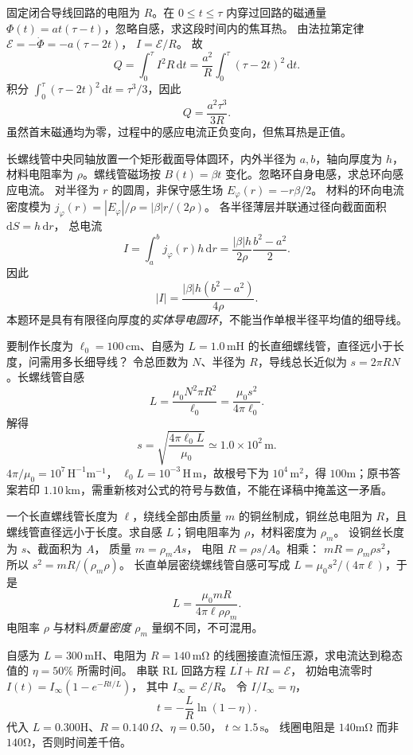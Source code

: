 固定闭合导线回路的电阻为 $R$。在 $0\le t\le\tau$ 内穿过回路的磁通量
$\Phi(t)=at(\tau-t)$，忽略自感，求这段时间内的焦耳热。
\exsolution
由法拉第定律
$\mathcal E=-\dot\Phi=-a(\tau-2t)$，
$I=\mathcal E/R$。
故
\[
Q=\int_0^\tau I^2R\,\mathrm dt
=\frac{a^2}R\int_0^\tau(\tau-2t)^2\,\mathrm dt.
\]
积分
$\int_0^\tau(\tau-2t)^2\,\mathrm dt=\tau^3/3$，因此
\[
\boxed{Q=\frac{a^2\tau^3}{3R}}.
\]
\excheck 虽然首末磁通均为零，过程中的感应电流正负变向，但焦耳热是正值。

长螺线管中央同轴放置一个矩形截面导体圆环，内外半径为 $a,b$，轴向厚度为 $h$，材料电阻率为 $\rho$。螺线管磁场按 $B(t)=\beta t$ 变化。忽略环自身电感，求总环向感应电流。
\exsolution
对半径为 $r$ 的圆周，非保守感生场
$E_\varphi(r)=-r\beta/2$。
材料的环向电流密度模为
$j_\varphi(r)=|E_\varphi|/\rho=|\beta|r/(2\rho)$。
各半径薄层并联通过径向截面面积
$\mathrm dS=h\,\mathrm dr$，
总电流
\[
I=\int_a^bj_\varphi(r)h\,\mathrm dr
=\frac{|\beta|h}{2\rho}\frac{b^2-a^2}{2}.
\]
因此
\[
\boxed{|I|=\frac{|\beta|h(b^2-a^2)}{4\rho}}.
\]
\excheck 本题环是具有有限径向厚度的\emph{实体导电圆环}，不能当作单根半径平均值的细导线。

要制作长度为 $\ell_0=100\,\mathrm{cm}$、自感为 $L=1.0\,\mathrm{mH}$ 的长直细螺线管，直径远小于长度，问需用多长细导线？
\exsolution
令总匝数为 $N$、半径为 $R$，导线总长近似为 $s=2\pi RN$。长螺线管自感
\[
L=\frac{\mu_0N^2\pi R^2}{\ell_0}
=\frac{\mu_0s^2}{4\pi\ell_0}.
\]
解得
\[
\boxed{s=\sqrt{\frac{4\pi\ell_0L}{\mu_0}}
\simeq1.0\times10^2\,\mathrm m}.
\]
\excheck $4\pi/\mu_0=10^7\,\mathrm{H^{-1}m^{-1}}$，
$\ell_0L=10^{-3}\,\mathrm{H\,m}$，故根号下为 $10^4\,\mathrm{m^2}$，得 $100$m；原书答案若印 $1.10\,\mathrm{km}$，需重新核对公式的符号与数值，不能在译稿中掩盖这一矛盾。

一个长直螺线管长度为 $\ell$，绕线全部由质量 $m$ 的铜丝制成，铜丝总电阻为 $R$，且螺线管直径远小于长度。求自感 $L$；铜电阻率为 $\rho$，材料密度为 $\rho_m$。
\exsolution
设铜丝长度为 $s$、截面积为 $A$，
质量 $m=\rho_mAs$，
电阻 $R=\rho s/A$。相乘：
$mR=\rho_m\rho s^2$，所以
$s^2=mR/(\rho_m\rho)$。
长直单层密绕螺线管自感可写成
$L=\mu_0s^2/(4\pi\ell)$，于是
\[
\boxed{L=\frac{\mu_0mR}{4\pi\ell\rho\rho_m}}.
\]
\excheck 电阻率 $\rho$ 与材料\emph{质量密度} $\rho_m$ 量纲不同，不可混用。

自感为 $L=300\,\mathrm{mH}$、电阻为 $R=140\,\mathrm{m\Omega}$ 的线圈接直流恒压源，求电流达到稳态值的 $\eta=50\%$ 所需时间。
\exsolution
串联 RL 回路方程
$L\dot I+RI=\mathcal E$，
初始电流零时
$I(t)=I_\infty(1-e^{-Rt/L})$，
其中 $I_\infty=\mathcal E/R$。
令 $I/I_\infty=\eta$，
\[
\boxed{t=-\frac LR\ln(1-\eta)}.
\]
代入 $L=0.300$H、$R=0.140\,\Omega$、$\eta=0.50$，
$\boxed{t\simeq1.5\,\mathrm s}$。
\excheck 线圈电阻是 $140$mΩ 而非 $140$Ω，否则时间差千倍。


